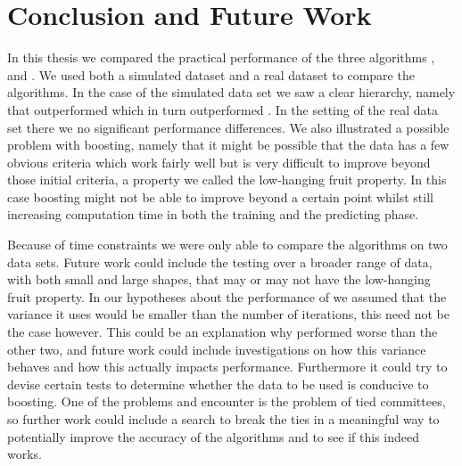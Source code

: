 \chapter{Conclusion and Future Work} 
\label{sec:Concl}

In this thesis we compared the practical performance of the three algorithms \adaB, \NHB and \squintB.  We used both a simulated dataset and a real dataset to compare the algorithms. In the case of the simulated data set we saw a clear hierarchy, namely that \NHB outperformed \adaB which in turn outperformed \squintB. In the setting of the real data set  there we no significant performance differences.
We also illustrated a possible problem with boosting, namely that it might be possible that the data has a few obvious criteria which work fairly well but is very difficult to improve beyond those initial criteria, a property we called the low-hanging fruit property. In this case boosting might not be able to improve beyond a certain point whilst still increasing computation time in both the training and the predicting phase. 

\par Because of time constraints we were only able to compare the algorithms on two data sets. Future work could include the testing over a broader range of data, with both small and large shapes, that may or may not have the low-hanging fruit property. In our hypotheses about the performance of \squintB we assumed that the variance it uses would be smaller than the number of iterations, this need not be the case however. This could be an explanation why \squinB performed worse than the other two, and future work could include investigations on how this variance behaves and how this actually impacts performance. Furthermore it could try to devise certain tests to determine whether the data to be used is conducive to boosting. One of the problems \squintB and \NHB encounter is the problem of tied committees, so further work could include a search to break the ties in a meaningful way to potentially improve the accuracy of the algorithms and to see if this indeed works.